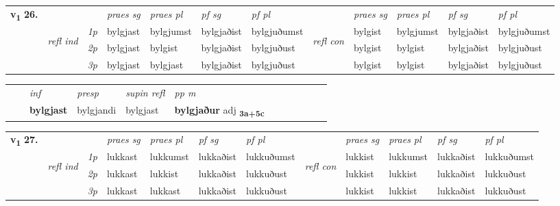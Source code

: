 \begin{tabular}{llllllllllll} \toprule
\multirow{4}{*}{{{\textbf{v{\textsubscript{1}}} \Large{\textbf{26.}}}}}  & &   &  \textit{praes sg}  & \textit{praes pl}  &\textit{pf sg} & \textit{pf pl} &  &  \textit{praes sg}  & \textit{praes pl}  & \textit{pf sg} & \textit{pf pl } \\*
	\cmidrule{4-7} \cmidrule{9-12}
 &\multirow{3}{*}{\begin{turn}{90}\textit{refl ind}\end{turn}} & {\textit{1p}} & bylgjast & bylgjumst    & bylgjaðist & bylgjuðumst & \multirow{3}{*}{\begin{turn}{90}\textit{refl con}\end{turn}}  &bylgist & bylgjumst & bylgjaðist & bylgjuðumst\\*
 &&  {\textit{2p}} &  bylgjast  & bylgist   & bylgjaðist & bylgjuðust & &bylgist & bylgist & bylgjaðist & bylgjuðust \\*
& &  {\textit{3p}} & bylgjast & bylgjast   & bylgjaðist & bylgjuðust & & bylgist & bylgist& bylgjaðist & bylgjuðust  \\*
\cmidrule{4-7} \cmidrule{9-12}
\end{tabular}


\begin{tabular}{llllllllllll}
 & & \textit{inf}     & \textit{presp}  & \textit{supin refl} & \textit{pp m}     \\*
  & & \textbf{bylgjast}      & bylgjandi  & bylgjast & \textbf{bylgjaður} adj \textbf{\textsubscript{3a+5c}} \\*
\cmidrule{1-12}
\end{tabular}



\begin{tabular}{llllllllllll} \toprule
\multirow{4}{*}{{{\textbf{v{\textsubscript{1}}} \Large{\textbf{27.}}}}}  & &   &  \textit{praes sg}  & \textit{praes pl}  &\textit{pf sg} & \textit{pf pl} &  &  \textit{praes sg}  & \textit{praes pl}  & \textit{pf sg} & \textit{pf pl } \\*
	\cmidrule{4-7} \cmidrule{9-12}
 &\multirow{3}{*}{\begin{turn}{90}\textit{refl ind}\end{turn}} & {\textit{1p}} & lukkast & lukkumst    & lukkaðist & lukkuðumst & \multirow{3}{*}{\begin{turn}{90}\textit{refl con}\end{turn}}  &lukkist & lukkumst & lukkaðist & lukkuðumst\\*
 &&  {\textit{2p}} &  lukkast  & lukkist   & lukkaðist & lukkuðust & &lukkist & lukkist & lukkaðist & lukkuðust \\*
& &  {\textit{3p}} & lukkast & lukkast   & lukkaðist & lukkuðust & & lukkist & lukkist& lukkaðist & lukkuðust  \\*
\cmidrule{4-7} \cmidrule{9-12}
\end{tabular}


